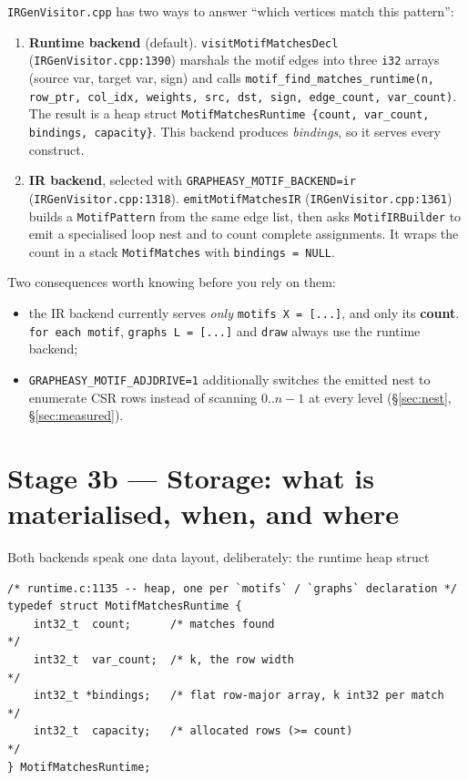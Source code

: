 \documentclass[11pt,a4paper]{article}
\newcommand{\code}[1]{\texttt{#1}}
\newcommand{\file}[1]{\texttt{#1}}
\begin{document}
\file{IRGenVisitor.cpp} has two ways to answer ``which vertices match this
pattern'':

\begin{enumerate}
  \item \textbf{Runtime backend} (default). \code{visitMotifMatchesDecl}
        (\file{IRGenVisitor.cpp:1390}) marshals the motif edges into three
        \code{i32} arrays (source var, target var, sign) and calls
        \code{motif\_find\_matches\_runtime(n, row\_ptr, col\_idx, weights,
        src, dst, sign, edge\_count, var\_count)}. The result is a heap struct
        \code{MotifMatchesRuntime \{count, var\_count, bindings, capacity\}}.
        This backend produces \emph{bindings}, so it serves every construct.
  \item \textbf{IR backend}, selected with
        \code{GRAPHEASY\_MOTIF\_BACKEND=ir} (\file{IRGenVisitor.cpp:1318}).
        \code{emitMotifMatchesIR} (\file{IRGenVisitor.cpp:1361}) builds a
        \code{MotifPattern} from the same edge list, then asks
        \code{MotifIRBuilder} to emit a specialised loop nest and to count
        complete assignments. It wraps the count in a stack
        \code{MotifMatches} with \code{bindings = NULL}.
\end{enumerate}

Two consequences worth knowing before you rely on them:

\begin{itemize}
  \item the IR backend currently serves \emph{only} \code{motifs X = [...]},
        and only its \textbf{count}. \code{for each motif}, \code{graphs L =
        [...]} and \code{draw} always use the runtime backend;
  \item \code{GRAPHEASY\_MOTIF\_ADJDRIVE=1} additionally switches the emitted
        nest to enumerate CSR rows instead of scanning $0..n-1$ at every level
        (\S\ref{sec:nest}, \S\ref{sec:measured}).
\end{itemize}

\section{Stage 3b --- Storage: what is materialised, when, and where}
\label{sec:storage}

Both backends speak one data layout, deliberately: the runtime heap struct

\begin{lstlisting}[style=cpp]
/* runtime.c:1135 -- heap, one per `motifs` / `graphs` declaration */
typedef struct MotifMatchesRuntime {
    int32_t  count;      /* matches found                                  */
    int32_t  var_count;  /* k, the row width                               */
    int32_t *bindings;   /* flat row-major array, k int32 per match        */
    int32_t  capacity;   /* allocated rows (>= count)                      */
} MotifMatchesRuntime;
\end{lstlisting}
\end{document}

